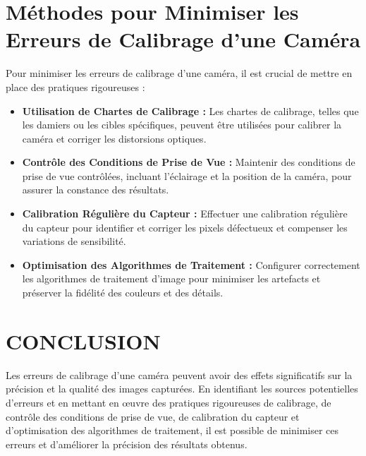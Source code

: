 \section{Méthodes pour Minimiser les Erreurs de Calibrage d'une Caméra}

Pour minimiser les erreurs de calibrage d'une caméra, il est crucial de mettre en place des pratiques rigoureuses :

\begin{itemize}
	\item \textbf{Utilisation de Chartes de Calibrage :} Les chartes de calibrage, telles que les damiers ou les cibles spécifiques, peuvent être utilisées pour calibrer la caméra et corriger les distorsions optiques.
	
	\item \textbf{Contrôle des Conditions de Prise de Vue :} Maintenir des conditions de prise de vue contrôlées, incluant l'éclairage et la position de la caméra, pour assurer la constance des résultats.
	
	\item \textbf{Calibration Régulière du Capteur :} Effectuer une calibration régulière du capteur pour identifier et corriger les pixels défectueux et compenser les variations de sensibilité.
	
	\item \textbf{Optimisation des Algorithmes de Traitement :} Configurer correctement les algorithmes de traitement d'image pour minimiser les artefacts et préserver la fidélité des couleurs et des détails.
\end{itemize}

\section{CONCLUSION}
Les erreurs de calibrage d'une caméra peuvent avoir des effets significatifs sur la précision et la qualité des images capturées. En identifiant les sources potentielles d'erreurs et en mettant en œuvre des pratiques rigoureuses de calibrage, de contrôle des conditions de prise de vue, de calibration du capteur et d'optimisation des algorithmes de traitement, il est possible de minimiser ces erreurs et d'améliorer la précision des résultats obtenus.